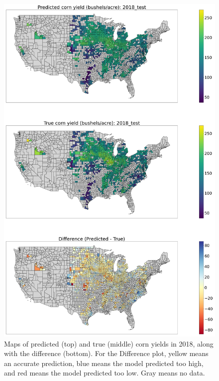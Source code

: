 \begin{figure}[tb]
\centering
\includegraphics[width=0.95\columnwidth]{figs/true_vs_predicted_map_corn_2018_test.png}
\caption{Maps of predicted (top) and true (middle) corn yields in 2018, along with the difference (bottom). For the Difference plot, yellow means an accurate prediction, blue means the model predicted too high, and red means the model predicted too low. Gray means no data.}
\label{map}
\end{figure}

